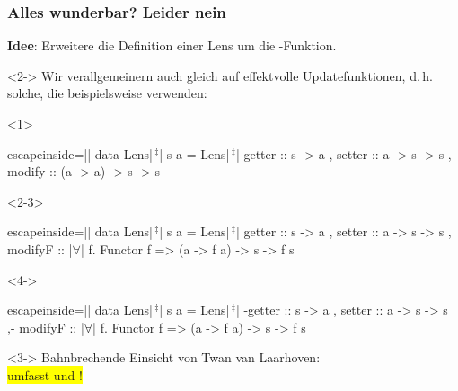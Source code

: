 \documentclass{beamer}
\newcommand{\kkreuz}{$\,^\ddag$} %
\newcommand{\fa}{$\forall$}
\begin{document}
\begin{frame}[fragile,t]
  \frametitle{
    Alles wunderbar? Leider nein
    \hfill
    {
      \small \color{greenncs}
    }
  }
  \textbf{Idee}: Erweitere die Definition einer Lens um die -Funktion. \\
  \begin{visibleenv}<2->
    Wir verallgemeinern auch gleich  auf effektvolle Updatefunktionen, d.\,h. solche, die beispielsweise  verwenden:
  \end{visibleenv}
  \begin{onlyenv}<1>
\begin{haskellcode*}{escapeinside=||}
data Lens|\kkreuz| s a = Lens|\kkreuz|
  { getter  :: s -> a
  , setter  :: a -> s -> s
  , modify  ::                   (a ->   a) -> s ->   s
  }
\end{haskellcode*}
  \end{onlyenv}
  \begin{onlyenv}<2-3>
\begin{haskellcode*}{escapeinside=||}
data Lens|\kkreuz| s a = Lens|\kkreuz|
  { getter  :: s -> a
  , setter  :: a -> s -> s
  , modifyF :: |\fa| f. Functor f => (a -> f a) -> s -> f s
  }
\end{haskellcode*}
  \end{onlyenv}
  \begin{onlyenv}<4->
\begin{haskellcode*}{escapeinside=||}
data Lens|\kkreuz| s a = Lens|\kkreuz|
  { {-getter  :: s -> a
  , setter  :: a -> s -> s
  ,-} modifyF :: |\fa| f. Functor f => (a -> f a) -> s -> f s
  }
\end{haskellcode*}
  \end{onlyenv}

  \vspace{2em}

  \begin{onlyenv}<3->
    \Large Bahnbrechende Einsicht von Twan van Laarhoven: \\

    \colorbox{yellow}{
      \huge {} umfasst  und !
    }
  \end{onlyenv}
\end{frame}

\end{document}
